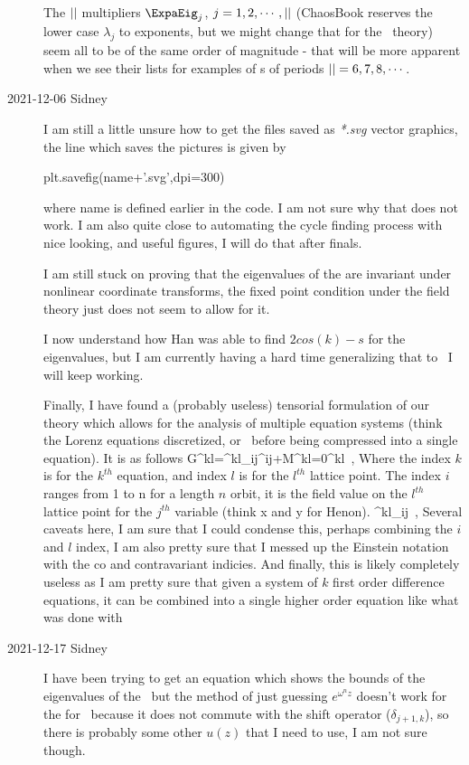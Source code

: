 \begin{description}
The ${||}$ multipliers $\ExpaEig_j$, $j=1,2,\cdots,{||}$ (ChaosBook
reserves the lower case $\lambda_j$ to exponents, but we might change that for
the \spt\ theory) seem all to be of the same
order of magnitude - that will be more apparent when we see their lists for
examples of {\lattstate}s of periods ${||}=6,7,8,\cdots$.


\item[2021-12-06 Sidney]
I am still a little unsure how to get the files saved as \emph{*.svg}
vector graphics, the line which saves the pictures is given by

plt.savefig(name+'.svg',dpi=300)

where name is defined earlier in the
code. I am not sure why that does not work. I am also quite close to
automating the cycle finding process with nice looking, and useful
figures, I will do that after finals.

I am still stuck on proving that the eigenvalues of the {\jacobianOrb} are invariant under nonlinear coordinate transforms, the fixed point condition under the field theory just does not seem to allow for it.

I now understand how Han was able to find $2cos(k)-s$ for the eigenvalues, but I am currently having a hard time generalizing that to \henlatt\ I will keep working.

Finally, I have found a (probably useless) tensorial formulation of our theory which allows for the analysis of multiple equation systems (think the Lorenz equations discretized, or \henlatt\ before being compressed into a single equation). It is as follows
\beq
G^{kl}\left[\Phi\right]=\Gamma^{kl}_{ij}\Phi^{ij}+M^{kl}=0^{kl}
\,,
Where the index $k$ is for the $k^{th}$ equation, and index $l$ is for the $l^{th}$ lattice point. The index $i$ ranges from 1 to n for a length $n$ orbit, it is the field value on the $l^{th}$ lattice point for the $j^{th}$ variable (think x and y for Henon).
\beq
\Gamma^{kl}_{ij}\equiv{}
\,,
Several caveats here, I am sure that I could condense this, perhaps combining the $i$ and $l$ index, I am also pretty sure that I messed up the Einstein notation with the co and contravariant indicies. And finally, this is likely completely useless as I am pretty sure that given a system of $k$ first order difference equations, it can be combined into a single higher order equation like what was done with \henlatt\

\item[2021-12-17 Sidney]
I have been trying to get an equation which shows the bounds of the
eigenvalues of the \henlatt\ but the method of just guessing
$e^{\omega^nz}$ doesn't work for the {\jacobianOrb} for \Henon\ because it
does not commute with the shift operator ($\delta_{j+1,k}$), so there is
probably some other $u(z)$ that I need to use, I am not sure though.


\end{description}

